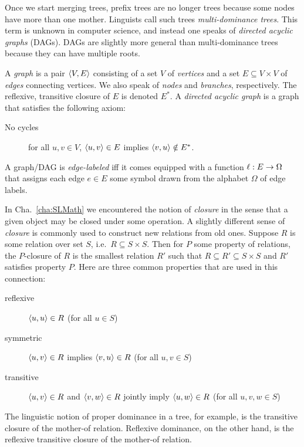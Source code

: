 Once we start merging trees, prefix trees are no longer trees because some nodes have more than one mother.
Linguists call such trees \emph{multi-dominance trees}.
This term is unknown in computer science, and instead one speaks of \emph{directed acyclic graphs} (DAGs).
DAGs are slightly more general than multi-dominance trees because they can have multiple roots.
%
\begin{definition}[DAG]
    A \emph{graph} is a pair $\left \langle V,E \right \rangle $ consisting of a set $V$ of \emph{vertices} and a set $E \subseteq V \times V $ of \emph{edges} connecting vertices.
    We also speak of \emph{nodes} and \emph{branches}, respectively.
    The reflexive, transitive closure of $E$ is denoted $E^*$.
    A \emph{directed acyclic graph} is a graph that satisfies the following axiom:
    \begin{description}
        \item[No cycles] for all $u,v \in V$, $\left \langle u,v \right \rangle  \in E$ implies $\left \langle v,u \right \rangle  \notin E^*$.
    \end{description}
    A graph\slash DAG is \emph{edge-labeled} iff it comes equipped with a function $\ell: E \rightarrow \Omega$ that assigns each edge $e \in E$ some symbol drawn from the alphabet $\Omega$ of edge labels.
\end{definition}
%
\begin{techinfo}
    In Cha.~\ref{cha:SLMath} we encountered the notion of \emph{closure} in the sense that a given object may be closed under some operation.
    A slightly different sense of \emph{closure} is commonly used to construct new relations from old ones.
    Suppose $R$ is some relation over set $S$, i.e.\ $R \subseteq S \times S$.
    Then for $P$ some property of relations, the $P$-closure of $R$ is the smallest relation $R'$ such that $R \subseteq R' \subseteq S \times S$ and $R'$ satisfies property $P$.
    Here are three common properties that are used in this connection:
    \begin{description}
        \item[reflexive] $\left \langle u,u \right \rangle  \in R$ (for all $u \in S$)
        \item[symmetric] $\left \langle u,v \right \rangle  \in R$ implies $\left \langle v,u \right \rangle  \in R$ (for all $u,v \in S$)
        \item[transitive] $\left \langle u,v \right \rangle  \in R$ and $\left \langle v,w \right \rangle  \in R$ jointly imply $\left \langle u,w \right \rangle  \in R$ (for all $u,v,w \in S$)
    \end{description}
    The linguistic notion of proper dominance in a tree, for example, is the transitive closure of the mother-of relation.
    Reflexive dominance, on the other hand, is the reflexive transitive closure of the mother-of relation.
\end{techinfo}

